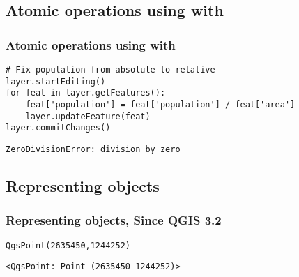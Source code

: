 \subsection{Atomic operations using with}
\begin{frame}[fragile]
\frametitle{Atomic operations using with}

\begin{lstlisting}[style=pythoncode]
# Fix population from absolute to relative
layer.startEditing()
for feat in layer.getFeatures():
	feat['population'] = feat['population'] / feat['area']
	layer.updateFeature(feat)
layer.commitChanges()
\end{lstlisting}
\pause
\begin{lstlisting}[style=pythonoutput]
ZeroDivisionError: division by zero
\end{lstlisting}

\end{frame}

\subsection{Representing objects}
\begin{frame}[fragile]
\frametitle{Representing objects, Since QGIS 3.2}

\begin{lstlisting}[style=pythoncode]
QgsPoint(2635450,1244252)
\end{lstlisting}
\pause
\begin{lstlisting}[style=pythonoutput]
<QgsPoint: Point (2635450 1244252)>
\end{lstlisting}

\end{frame}
